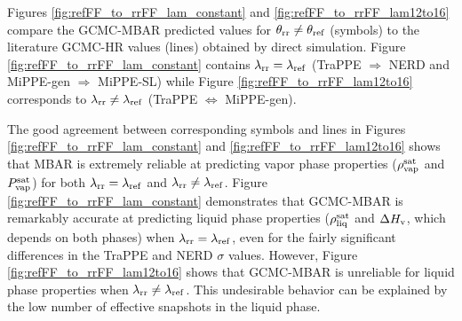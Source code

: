 \documentclass[journal=jced,manuscript=article]{achemso}
\begin{document}


Figures \ref{fig:refFF_to_rrFF_lam_constant} and \ref{fig:refFF_to_rrFF_lam12to16} compare the GCMC-MBAR predicted values for $\theta_{\rm rr} \neq \theta_{\rm ref}$ (symbols) to the literature GCMC-HR values (lines) obtained by direct simulation. Figure \ref{fig:refFF_to_rrFF_lam_constant} contains $\lambda_{\rm rr} = \lambda_{\rm ref}$ (TraPPE $\Rightarrow$ NERD and MiPPE-gen $\Rightarrow$ MiPPE-SL) while Figure \ref{fig:refFF_to_rrFF_lam12to16} corresponds to $\lambda_{\rm rr} \neq \lambda_{\rm ref}$ (TraPPE $\Leftrightarrow$ MiPPE-gen). 

The good agreement between corresponding symbols and lines in Figures \ref{fig:refFF_to_rrFF_lam_constant} and \ref{fig:refFF_to_rrFF_lam12to16} shows that MBAR is extremely reliable at predicting vapor phase properties ($\rho_{\rm vap}^{\rm sat}$ and $P_{\rm vap}^{\rm sat}$) for both $\lambda_{\rm rr} = \lambda_{\rm ref}$ and $\lambda_{\rm rr} \neq \lambda_{\rm ref}$. Figure \ref{fig:refFF_to_rrFF_lam_constant} demonstrates that GCMC-MBAR is remarkably accurate at predicting liquid phase properties ($\rho_{\rm liq}^{\rm sat}$ and $\Delta H_{\rm v}$, which depends on both phases) when $\lambda_{\rm rr} = \lambda_{\rm ref}$, even for the fairly significant differences in the TraPPE and NERD $\sigma$ values. However, Figure \ref{fig:refFF_to_rrFF_lam12to16} shows that GCMC-MBAR is unreliable for liquid phase properties when $\lambda_{\rm rr} \neq \lambda_{\rm ref}$. This undesirable behavior can be explained by the low number of effective snapshots in the liquid phase.
\end{document}
